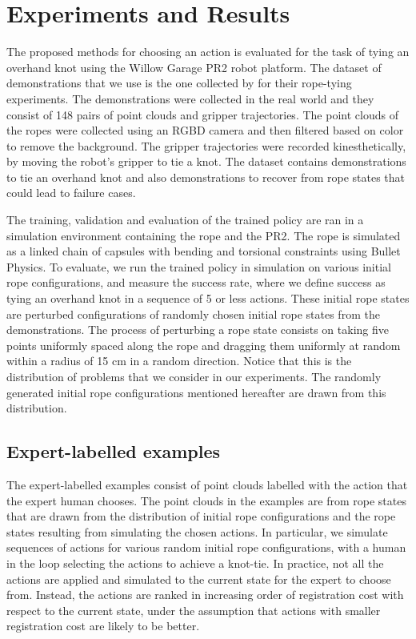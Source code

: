 \section{Experiments and Results}
\label{sec:experiments}

The proposed methods for choosing an action is evaluated for the task of tying an overhand knot using the Willow Garage PR2 robot platform.
The dataset of demonstrations that we use is the one collected by \citet{Schulmanetal_ISRR2013} for their rope-tying experiments.
The demonstrations were collected in the real world and they consist of 148 pairs of point clouds and gripper trajectories.
The point clouds of the ropes were collected using an RGBD camera and then filtered based on color to remove the background.
The gripper trajectories were recorded kinesthetically, by moving the robot's gripper to tie a knot.
The dataset contains demonstrations to tie an overhand knot and also demonstrations to recover from rope states that could lead to failure cases.

The training, validation and evaluation of the trained policy are ran in a simulation environment containing the rope and the PR2.
The rope is simulated as a linked chain of capsules with bending and torsional constraints using Bullet Physics.
To evaluate, we run the trained policy in simulation on various initial rope configurations, and measure the success rate, where we define success as tying an overhand knot in a sequence of 5 or less actions.
These initial rope states are perturbed configurations of randomly chosen initial rope states from the demonstrations.
The process of perturbing a rope state consists on taking five points uniformly spaced along the rope and dragging them uniformly at random within a radius of 15 cm in a random direction.
Notice that this is the distribution of problems that we consider in our experiments.
The randomly generated initial rope configurations mentioned hereafter are drawn from this distribution.

\subsection{Expert-labelled examples}
The expert-labelled examples consist of point clouds labelled with the action that the expert human chooses.
The point clouds in the examples are from rope states that are drawn from the distribution of initial rope configurations and the rope states resulting from simulating the chosen actions.
In particular, we simulate sequences of actions for various random initial rope configurations, with a human in the loop selecting the actions to achieve a knot-tie.
In practice, not all the actions are applied and simulated to the current state for the expert to choose from.
Instead, the actions are ranked in increasing order of registration cost with respect to the current state, under the assumption that actions with smaller registration cost are likely to be better.

